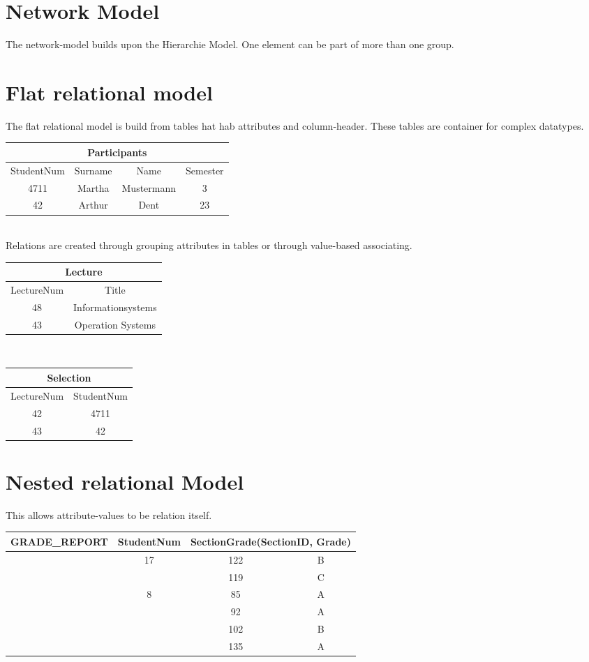 \section{Network Model}
The network-model builds upon the Hierarchie Model. One element can be part of
more than one group.

\section{Flat relational model}
The flat relational model is build from tables hat hab attributes and
column-header. These tables are container for complex datatypes.\\
\begin{tabular}{|c|c|c|c|}
\hline
\multicolumn{4}{|c|}{Participants}\\
\hline
StudentNum & Surname & Name & Semester \\
\hline
4711 & Martha & Mustermann & 3 \\
\hline
42 & Arthur & Dent & 23\\
\hline
\end{tabular}\\
Relations are created through grouping attributes in tables or through
value-based associating.\\
\begin{tabular}{|c|c|}
\hline
\multicolumn{2}{|c|}{Lecture}\\
\hline
LectureNum & Title \\
\hline
48 & Informationsystems \\
\hline
43 & Operation Systems\\
\hline
\end{tabular}\\

\begin{tabular}{|c|c|}
\hline
\multicolumn{2}{|c|}{Selection}\\
\hline
LectureNum & StudentNum \\
\hline
42 & 4711 \\
\hline
43 & 42\\
\hline
\end{tabular}

\section{Nested relational Model}
This allows attribute-values to be relation itself.\\

\scriptsize \begin{tabular}{|c|c|c|c|} 
\hline
GRADE\_REPORT & StudentNum & \multicolumn{2}{|c|}{SectionGrade(SectionID,
Grade)}\\
\hline
& \multirow{2}{*}{17} & 122 & B\\
\cline{3-4}
& & 119 & C\\
\hline
& \multirow{4}{*}{8} & 85 & A\\
& & 92 & A\\
\cline{3-4}
& & 102 & B\\
\cline{3-4}
& & 135 & A\\
\hline
\end{tabular}

